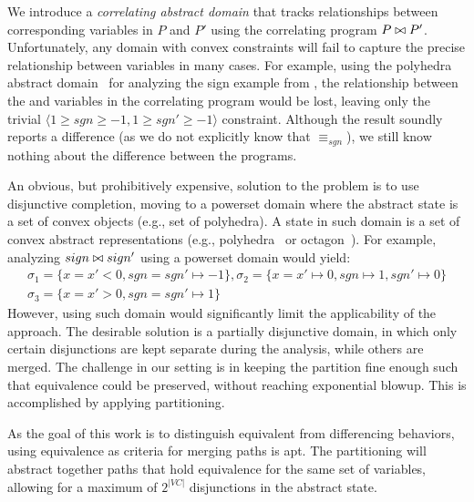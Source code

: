 We introduce a \emph{correlating abstract domain} that tracks relationships between corresponding variables in $P$ and $P'$ using the correlating program $P \bowtie P'$. Unfortunately, any domain with convex constraints will fail to capture the precise relationship between variables in many cases. For example, using the polyhedra abstract domain~\cite{CousotHalbwachs78} for analyzing the sign example from , the relationship between the  and  variables in the correlating program would be lost, leaving only the trivial $\langle 1 \geq sgn \geq -1, 1 \geq sgn' \geq -1 \rangle$ constraint. Although the result soundly reports a difference (as we do not explicitly know that $\equiv_{sgn}$), we still know nothing about the difference between the programs.

An obvious, but prohibitively expensive, solution to the problem is to use disjunctive completion, moving to a powerset domain where the abstract state is a set of convex objects (e.g., set of polyhedra).
A state in such domain is a set of convex abstract representations (e.g., polyhedra~\cite{CousotHalbwachs78} or octagon~\cite{Mine2006}). For example, analyzing $sign \bowtie sign'$ using a powerset domain would yield:
{\footnotesize
\[
\begin{array}{c}
\sigma_1 = \{x = x' < 0, sgn = sgn' \mapsto -1\} ,
\sigma_2 = \{x = x' \mapsto 0, sgn \mapsto 1, sgn' \mapsto 0\}\\
\sigma_3 = \{x = x' > 0, sgn = sgn' \mapsto 1\}
\end{array}
\]
}
However, using such domain would significantly limit the applicability of the approach. The desirable solution is a partially disjunctive domain, in which only certain disjunctions are kept separate during the analysis, while others are merged. The challenge in our setting is in keeping the partition fine enough such that equivalence could be preserved, without reaching exponential blowup. This is accomplished by applying partitioning.

 As the goal of this work is to distinguish equivalent from differencing behaviors, using equivalence as criteria for merging paths is apt. The partitioning will abstract together paths that hold equivalence for the same set of variables, allowing for a maximum of $2^{|VC|}$ disjunctions in the abstract state.

